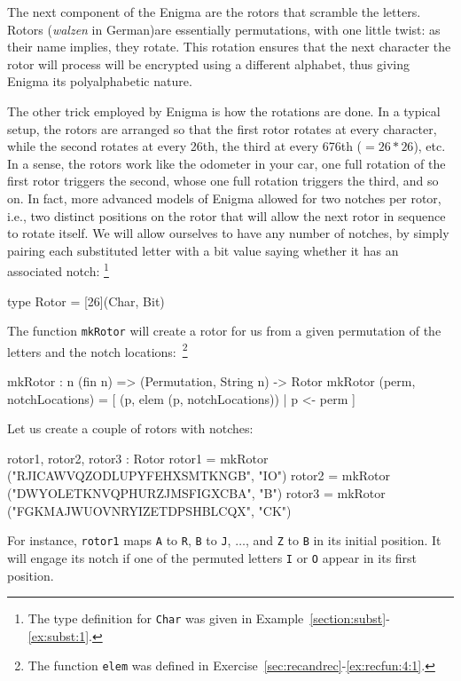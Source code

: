 The next component of the Enigma are the rotors that scramble the
letters.  Rotors ({\em walzen} in German)\indEnigmaRotor are
essentially permutations, with one little twist: as their name
implies, they rotate. This rotation ensures that the next character
the rotor will process will be encrypted using a different alphabet,
thus giving Enigma its polyalphabetic nature.\indPolyAlphSubst

The other trick employed by Enigma is how the rotations are done. In a
typical setup, the rotors are arranged so that the first rotor rotates
at every character, while the second rotates at every 26th, the third
at every 676th ($=26*26$), etc. In a sense, the rotors work like the
odometer in your car, one full rotation of the first rotor triggers
the second, whose one full rotation triggers the third, and so on. In
fact, more advanced models of Enigma allowed for two notches per
rotor, i.e., two distinct positions on the rotor that will allow the
next rotor in sequence to rotate itself. We will allow ourselves to
have any number of notches, by simply pairing each substituted letter
with a bit value saying whether it has an associated notch:
\footnote{The type definition for {\tt Char} was given in
  Example~\ref{section:subst}-\ref{ex:subst:1}.}

\begin{code}
  type Rotor = [26](Char, Bit)
\end{code}
The function {\tt mkRotor} will create a rotor for us from a given permutation of the letters and the notch
locations:~\footnote{The function {\tt elem} was defined in Exercise~\ref{sec:recandrec}-\ref{ex:recfun:4:1}.\indElem}
\begin{code}
  mkRotor : {n} (fin n) => (Permutation, String n) -> Rotor
  mkRotor (perm, notchLocations) = [ (p, elem (p, notchLocations))
                                    | p <- perm
                                   ]
\end{code}
Let us create a couple of rotors with notches:
\begin{code}
  rotor1, rotor2, rotor3 : Rotor
  rotor1 = mkRotor ("RJICAWVQZODLUPYFEHXSMTKNGB", "IO")
  rotor2 = mkRotor ("DWYOLETKNVQPHURZJMSFIGXCBA", "B")
  rotor3 = mkRotor ("FGKMAJWUOVNRYIZETDPSHBLCQX", "CK")
\end{code}
For instance, {\tt rotor1} maps {\tt A} to {\tt R}, {\tt B} to {\tt J},
$\ldots$, and {\tt Z} to {\tt B} in its initial position. It will engage its
notch if one of the permuted letters {\tt I} or {\tt O} appear in its first
position.

